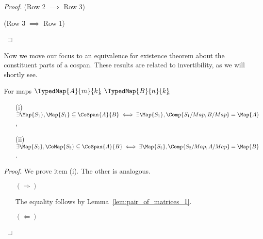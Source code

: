 \documentclass[manyauthors]{fundam}
\begin{document}
\begin{proof}
(Row 2 $\implies$ Row 3)
\begin{hcalculation}[=]{}
\end{hcalculation}

(Row 3 $\implies$ Row 1)
\begin{hcalculation}[=]{}
\end{hcalculation}
\end{proof}

Now we move our focus to an equivalence for existence theorem
about the constituent parts of a cospan.
These results are related to invertibility, as we will shortly see.

\begin{proposition}
  \label{prop:s_block}
  For maps $\TypedMap{A}{m}{k}\!\!$, $\TypedMap{B}{n}{k}\!\!$,
\begin{enumerate}
  \item[(i)] $\exists \Map{S_1}, \Map{S_1} \subseteq \CoSpan{A}{B}
      \iff
      \exists \Map{S_1}, \Comp{S_1/Map, B/Map} = \Map{A} $,
  \item[(ii)] $\exists \Map{S_2}, \CoMap{S_2} \subseteq \CoSpan{A}{B}
      \iff
      \exists \Map{S_2}, \Comp{S_2/Map, A/Map} = \Map{B} $.
\end{enumerate}
\end{proposition}

\begin{proof}
  We prove item (i). The other is analogous.
  \begin{enumerate}
    \item[$(\Rightarrow)$]
    \begin{hcalculation}[=]{}
    \end{hcalculation}
    The equality follows by Lemma~\ref{lem:pair_of_matrices_1}.
    \item[$(\Leftarrow)$]
    \begin{hcalculation}[=]{}
    \end{hcalculation}
  \end{enumerate}
\end{proof}
\end{document}
